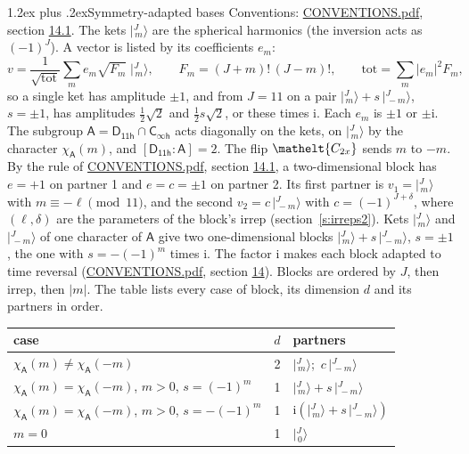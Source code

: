 \documentclass[10pt,a4paper]{article}
\makeatletter
\renewcommand\section{\@startsection{section}{1}{\z@}{-3ex plus -1ex minus -.2ex}%
  {1.2ex plus .2ex}{\normalfont\large\sffamily\bfseries\color{parttitle}}}
\numberwithin{equation}{section}
\newcommand{\eltfont}[1]{{\let\sigma\eltsigma\mathelt{#1}}}
\newcommand{\grp}[1]{\mathsf{#1}}
\newcommand{\elt}[1]{\eltfont{#1}}
\newcommand{\grpindex}[2]{[#1 : #2]}
\newcommand{\iunit}{\mathrm{i}}
\newcommand{\chiA}{\chi_{\grp{A}}}
\newcommand{\jm}[2]{\bigl\lvert{}^{#1}_{\,#2}\bigr\rangle}
\makeatother
\begin{document}
\section{Symmetry-adapted bases}\label{s:bases}
Conventions: \href{../../CONVENTIONS.pdf}{CONVENTIONS.pdf}, section \href{../../CONVENTIONS.pdf\#conv.14.1}{14.1}.
\leavevmode\label{n:index.m}\label{n:vector.ket}The kets $\jm{J}{m}$ are the spherical harmonics (the inversion acts as $(-1)^J$). \label{n:index.ketcoefficient}\label{n:vector.basis.symmetry}\label{n:index.ketweight}\label{n:index.total}A vector is listed by its coefficients $e_m$:
\begin{equation}\label{e:ket}v = \frac{1}{\sqrt{\mathrm{tot}}}\sum_m e_m\sqrt{F_m}\;\jm{J}{m},\qquad F_m = (J+m)!\,(J-m)!,\qquad \mathrm{tot} = \sum_m |e_m|^2F_m,\end{equation}
\leavevmode\label{n:index.pair.sign}so a single ket has amplitude $\pm1$, and from $J = 11$ on a pair $\jm{J}{m} + s\,\jm{J}{-m}$, $s = \pm1$, has amplitudes $\tfrac{1}{2}\sqrt{2}$ and $\tfrac{1}{2}s\sqrt{2}$, or these times $\iunit$. Each $e_m$ is $\pm1$ or $\pm\iunit$.
\leavevmode\label{n:group.A}\label{n:function.character.abelian}The subgroup $\grp{A} = \grp{D_{11h}}\cap\grp{C_{\infty h}}$ acts diagonally on the kets, on $\jm{J}{m}$ by the character $\chiA(m)$, and $\grpindex{\grp{D_{11h}}}{\grp{A}} = 2$. The flip $\elt{C_{2x}}$ sends $m$ to $-m$. \label{n:index.partner.sign}By the rule of \href{../../CONVENTIONS.pdf}{CONVENTIONS.pdf}, section \href{../../CONVENTIONS.pdf\#conv.14.1}{14.1}, a two-dimensional block has $e = +1$ on partner 1 and $e = c = \pm1$ on partner 2. Its first partner is $v_1 = \jm{J}{m}$ with $m \equiv -\ell \pmod{11}$, and the second $v_2 = c\,\jm{J}{-m}$ with $c = (-1)^{J+\delta}$, where $(\ell, \delta)$ are the parameters of the block's irrep (section~\ref{s:irreps2}). Kets $\jm{J}{m}$ and $\jm{J}{-m}$ of one character of $\grp{A}$ give two one-dimensional blocks $\jm{J}{m} + s\,\jm{J}{-m}$, $s = \pm1$, the one with $s = -(-1)^m$ times $\iunit$. The factor $\iunit$ makes each block adapted to time reversal (\href{../../CONVENTIONS.pdf}{CONVENTIONS.pdf}, section \href{../../CONVENTIONS.pdf\#conv.14}{14}). Blocks are ordered by $J$, then irrep, then $|m|$.
\leavevmode\label{n:head.case}\label{n:head.partners}The table lists every case of block, its dimension $d$ and its partners in order.
\begin{center}\begin{tabular}{@{}lrl@{}}\toprule
case & $d$ & partners\\\midrule
$\chiA(m) \ne \chiA(-m)$ & 2 & $\jm{J}{m}$;\ $c\,\jm{J}{-m}$\\
$\chiA(m) = \chiA(-m)$, $m > 0$, $s = (-1)^m$ & 1 & $\jm{J}{m} + s\,\jm{J}{-m}$\\
$\chiA(m) = \chiA(-m)$, $m > 0$, $s = -(-1)^m$ & 1 & $\iunit(\jm{J}{m} + s\,\jm{J}{-m})$\\
$m = 0$ & 1 & $\jm{J}{0}$\\
\bottomrule\end{tabular}\end{center}
\end{document}
